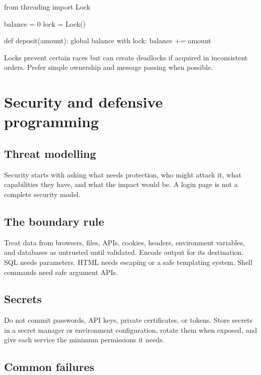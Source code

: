 \documentclass[11pt,openany,oneside]{book}
\begin{document}
\begin{code}[language=Python]
from threading import Lock

balance = 0
lock = Lock()

def deposit(amount):
    global balance
    with lock:
        balance += amount
\end{code}

Locks prevent certain races but can create deadlocks if acquired in inconsistent orders. Prefer simple ownership and message passing when possible.

\chapter{Security and defensive programming}

\section{Threat modelling}

Security starts with asking what needs protection, who might attack it, what capabilities they have, and what the impact would be. A login page is not a complete security model.

\section{The boundary rule}

Treat data from browsers, files, APIs, cookies, headers, environment variables, and databases as untrusted until validated. Encode output for its destination. SQL needs parameters. HTML needs escaping or a safe templating system. Shell commands need safe argument APIs.

\section{Secrets}

Do not commit passwords, API keys, private certificates, or tokens. Store secrets in a secret manager or environment configuration, rotate them when exposed, and give each service the minimum permissions it needs.

\section{Common failures}
\end{document}
